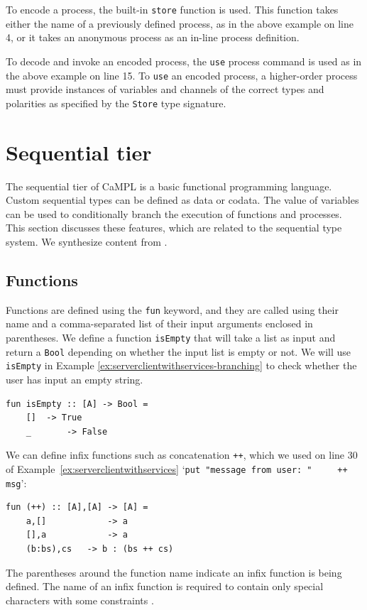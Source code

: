 \documentclass[11pt]{article}
\begin{document}
To encode a process, the built-in \lstinline$store$ function is used.
This function takes either the name of a previously defined process, as in the above example on line 4, or it takes an anonymous process as an in-line process definition.

To decode and invoke an encoded process, the \lstinline$use$ process command is used as in the above example on line 15.
To \lstinline$use$ an encoded process, a higher-order process must provide instances of variables and channels of the correct types and polarities as specified by the \lstinline$Store$ type signature.


\section{Sequential tier}
\label{Sec:SequentialTypes}

The sequential tier of CaMPL is a basic functional programming language.
Custom sequential types can be defined as data or codata.
The value of variables can be used to conditionally branch the execution of functions and processes.
This section discusses these features, which are related to the sequential type system.
We synthesize content from \cite{Ku18, Po21, Po22}.

\subsection{Functions}
\label{sec:funcs}

Functions are defined using the \lstinline{fun} keyword, and they are called using their name and a comma-separated list of their input arguments enclosed in parentheses.
We define a function \lstinline{isEmpty} that will take a list as input and return a \lstinline$Bool$ depending on whether the input list is empty or not. We will use \lstinline{isEmpty} in Example \ref{ex:serverclientwithservices-branching} to check whether the user has input an empty string.
\begin{lstlisting}[label=ex:isEmpty, caption=Sequential function that checks if a list is empty]
fun isEmpty :: [A] -> Bool =
	[]	-> True
	_		-> False
\end{lstlisting}
  
We can define infix functions such as concatenation \lstinline{++}, which we used on line 30 of Example~\ref{ex:serverclientwithservices} `\lstinline$put "message from user: "     ++ msg$':
\begin{lstlisting}[label=ex:concat, caption=Infix concatenation function]
fun (++) :: [A],[A] -> [A] =
	a,[]			-> a
	[],a 			-> a
	(b:bs),cs	-> b : (bs ++ cs)
\end{lstlisting}
The parentheses around the function name indicate an infix function is being defined.
The name of an infix function is required to contain only special characters with some constraints \cite{Fo23}.
\end{document}
